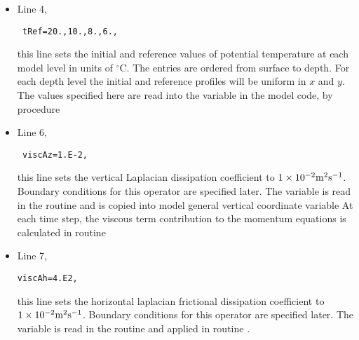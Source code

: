 \begin{itemize}

\item Line 4, 
\begin{verbatim} tRef=20.,10.,8.,6., \end{verbatim} 
this line sets the initial and reference values of potential
temperature at each model level in units of $^{\circ}\mathrm{C}$.  The entries
are ordered from surface to depth. For each depth level the initial
and reference profiles will be uniform in $x$ and $y$. The values
specified here are read into the variable  in the
model code, by procedure 


\item Line 6, 
\begin{verbatim} viscAz=1.E-2, \end{verbatim} 
this line sets the vertical Laplacian dissipation coefficient to $1
\times 10^{-2} {\rm m^{2}s^{-1}}$. Boundary conditions for this
operator are specified later.  The variable 
is read in the routine 
and is copied into model general vertical coordinate variable
 At each time step, the viscous term
contribution to the momentum equations is calculated in routine


\item Line 7, 
\begin{verbatim}
viscAh=4.E2,
\end{verbatim} 
  this line sets the horizontal laplacian frictional dissipation
  coefficient to $1 \times 10^{-2} {\rm m^{2}s^{-1}}$. Boundary
  conditions for this operator are specified later.  The variable
   is read in the routine
   and applied in routine
  .



\end{itemize}

